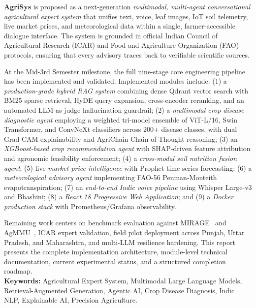 \documentclass[12pt,a4paper]{article}
\begin{document}
\textbf{AgriSys} is proposed as a next-generation \textit{multimodal, multi-agent conversational agricultural expert system} that unifies text, voice, leaf images, IoT soil telemetry, live market prices, and meteorological data within a single, farmer-accessible dialogue interface. The system is grounded in official Indian Council of Agricultural Research (ICAR) and Food and Agriculture Organization (FAO) protocols, ensuring that every advisory traces back to verifiable scientific sources.

At the Mid-3rd Semester milestone, the full nine-stage core engineering pipeline has been implemented and validated. Implemented modules include: (1) a \textit{production-grade hybrid RAG system} combining dense Qdrant vector search with BM25 sparse retrieval, HyDE query expansion, cross-encoder reranking, and an automated LLM-as-judge hallucination guardrail; (2) a \textit{multimodal crop disease diagnostic agent} employing a weighted tri-model ensemble of ViT-L/16, Swin Transformer, and ConvNeXt classifiers across 200+ disease classes, with dual Grad-CAM explainability and AgriChain Chain-of-Thought reasoning; (3) an \textit{XGBoost-based crop recommendation agent} with SHAP-driven feature attribution and agronomic feasibility enforcement; (4) a \textit{cross-modal soil nutrition fusion agent}; (5) live \textit{market price intelligence} with Prophet time-series forecasting; (6) a \textit{meteorological advisory agent} implementing FAO-56 Penman-Monteith evapotranspiration; (7) an \textit{end-to-end Indic voice pipeline} using Whisper Large-v3 and Bhashini; (8) a \textit{React 18 Progressive Web Application}; and (9) a \textit{Docker production stack} with Prometheus/Grafana observability.

Remaining work centers on benchmark evaluation against MIRAGE~\cite{mirage2025} and AgMMU~\cite{agmmu2025}, ICAR expert validation, field pilot deployment across Punjab, Uttar Pradesh, and Maharashtra, and multi-LLM resilience hardening. This report presents the complete implementation architecture, module-level technical documentation, current experimental status, and a structured completion roadmap.\\[0.35cm]

\noindent\textbf{Keywords:} Agricultural Expert System, Multimodal Large Language Models, Retrieval-Augmented Generation, Agentic AI, Crop Disease Diagnosis, Indic NLP, Explainable AI, Precision Agriculture.
\clearpage


\clearpage
\tableofcontents
\clearpage
\listoffigures
\vspace{1.2cm}
\listoftables
\clearpage
\end{document}
